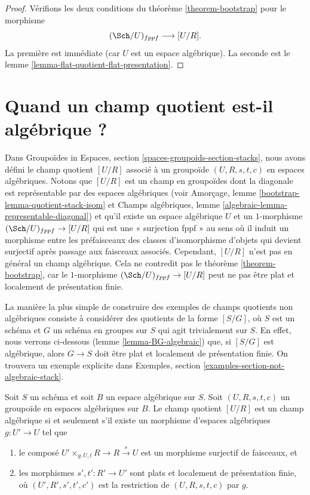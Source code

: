 \begin{proof}
Vérifions les deux conditions du
théorème \ref{theorem-bootstrap}
pour le morphisme
$$
(\Sch/U)_{fppf} \longrightarrow [U/R].
$$
La première est immédiate (car $U$ est un espace algébrique).
La seconde est le
lemme \ref{lemma-flat-quotient-flat-presentation}.
\end{proof}









\section{Quand un champ quotient est-il algébrique ?}
\label{section-quotient-algebraic}

\noindent
Dans
Groupoïdes in Espaces, section \ref{spaces-groupoids-section-stacks},
nous avons défini le champ quotient $[U/R]$ associé à un groupoïde
$(U, R, s, t, c)$ en espaces algébriques. Notons que $[U/R]$ est un champ
en groupoïdes dont la diagonale est représentable par des espaces algébriques (voir
Amorçage, lemme \ref{bootstrap-lemma-quotient-stack-isom}
et
Champs algébriques, lemme \ref{algebraic-lemma-representable-diagonal})
et qu'il existe un espace algébrique $U$ et un $1$-morphisme
$(\Sch/U)_{fppf} \to [U/R]$ qui est une « surjection fppf »
au sens où il induit un morphisme entre les préfaisceaux des classes d'isomorphisme
d'objets qui devient surjectif après passage aux faisceaux associés.
Cependant, $[U/R]$ n'est pas en général un champ
algébrique. Cela ne contredit pas le
théorème \ref{theorem-bootstrap},
car le $1$-morphisme $(\Sch/U)_{fppf} \to [U/R]$ peut ne pas
être plat et localement de présentation finie.

\medskip\noindent
La manière la plus simple de construire des exemples de champs quotients non algébriques
consiste à considérer des quotients de la forme $[S/G]$, où $S$ est un schéma et $G$
un schéma en groupes sur $S$ qui agit trivialement sur $S$. En effet, nous verrons
ci-dessous
(lemme \ref{lemma-BG-algebraic})
que, si $[S/G]$ est algébrique, alors $G \to S$ doit être plat et localement
de présentation finie. On trouvera un exemple explicite dans
Exemples, section \ref{examples-section-not-algebraic-stack}.

\begin{lemma}
\label{lemma-quotient-algebraic}
Soit $S$ un schéma et soit $B$ un espace algébrique sur $S$.
Soit $(U, R, s, t, c)$ un groupoïde en espaces algébriques sur $B$.
Le champ quotient $[U/R]$ est un champ algébrique si et seulement s'il
existe un morphisme d'espaces algébriques $g : U' \to U$ tel que
\begin{enumerate}
\item le composé
$U' \times_{g, U, t} R \to R \xrightarrow{s} U$ est un morphisme surjectif de
faisceaux, et
\item les morphismes $s', t' : R' \to U'$ sont plats et localement de présentation
finie, où $(U', R', s', t', c')$ est la restriction de
$(U, R, s, t, c)$ par $g$.
\end{enumerate}
\end{lemma}

